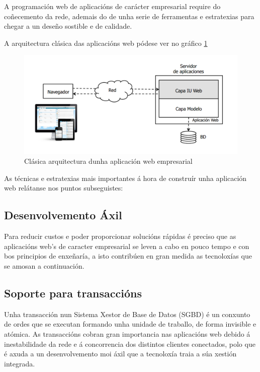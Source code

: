 	A programación web de aplicacións de carácter empresarial require do coñecemento da rede, ademais
	do de unha serie de ferramentas e estratexias para chegar a un deseño sostible e de calidade.
	
	A arquitectura clásica das aplicacións web pódese ver no gráfico \ref{fig:ArquitecturaAppWeb}
	
	\begin{figure}[htp]
	\begin{center}
		\includegraphics[scale=0.35]{figures/ArquitecturaAppWeb.png}
		\caption{Clásica arquitectura dunha aplicación web empresarial}
	\label{fig:ArquitecturaAppWeb}
	\end{center}
	\end{figure}

	As técnicas e estratexias mais importantes á hora de construír unha aplicación web relátanse nos
	puntos subseguistes:
	
	\subsection {Desenvolvemento Áxil}
		Para reducir custos e poder proporcionar solucións rápidas é preciso que as 
		aplicacións web's de caracter empresarial se leven a cabo en pouco tempo e con
		bos principios de enxeñaría, a isto contribúen en gran medida as tecnoloxías 
		que se amosan a continuación.
	
	\subsection{Soporte para transaccións}
		Unha transacción nun Sistema Xestor de Base de Datos (SGBD) é un conxunto de ordes que
		se executan formando unha unidade de traballo, de forma invisible e atómica. 
		As transaccións cobran gran importancia nas aplicacións web debido á inestabilidade 
		da rede e á concorrencia dos distintos clientes conectados, polo que é axuda a un 
		desenvolvemento moi áxil que a tecnoloxía traia a súa xestión integrada.
	

